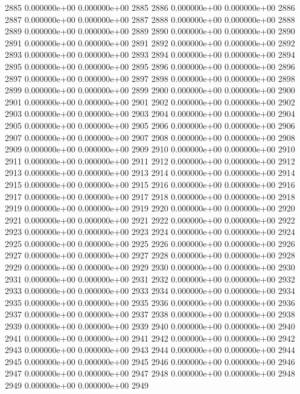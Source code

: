 \documentclass{article}
\begin{document}
\begin{Schunk}
\begin{Soutput}
2885   0.000000e+00   0.000000e+00 2885
2886   0.000000e+00   0.000000e+00 2886
2887   0.000000e+00   0.000000e+00 2887
2888   0.000000e+00   0.000000e+00 2888
2889   0.000000e+00   0.000000e+00 2889
2890   0.000000e+00   0.000000e+00 2890
2891   0.000000e+00   0.000000e+00 2891
2892   0.000000e+00   0.000000e+00 2892
2893   0.000000e+00   0.000000e+00 2893
2894   0.000000e+00   0.000000e+00 2894
2895   0.000000e+00   0.000000e+00 2895
2896   0.000000e+00   0.000000e+00 2896
2897   0.000000e+00   0.000000e+00 2897
2898   0.000000e+00   0.000000e+00 2898
2899   0.000000e+00   0.000000e+00 2899
2900   0.000000e+00   0.000000e+00 2900
2901   0.000000e+00   0.000000e+00 2901
2902   0.000000e+00   0.000000e+00 2902
2903   0.000000e+00   0.000000e+00 2903
2904   0.000000e+00   0.000000e+00 2904
2905   0.000000e+00   0.000000e+00 2905
2906   0.000000e+00   0.000000e+00 2906
2907   0.000000e+00   0.000000e+00 2907
2908   0.000000e+00   0.000000e+00 2908
2909   0.000000e+00   0.000000e+00 2909
2910   0.000000e+00   0.000000e+00 2910
2911   0.000000e+00   0.000000e+00 2911
2912   0.000000e+00   0.000000e+00 2912
2913   0.000000e+00   0.000000e+00 2913
2914   0.000000e+00   0.000000e+00 2914
2915   0.000000e+00   0.000000e+00 2915
2916   0.000000e+00   0.000000e+00 2916
2917   0.000000e+00   0.000000e+00 2917
2918   0.000000e+00   0.000000e+00 2918
2919   0.000000e+00   0.000000e+00 2919
2920   0.000000e+00   0.000000e+00 2920
2921   0.000000e+00   0.000000e+00 2921
2922   0.000000e+00   0.000000e+00 2922
2923   0.000000e+00   0.000000e+00 2923
2924   0.000000e+00   0.000000e+00 2924
2925   0.000000e+00   0.000000e+00 2925
2926   0.000000e+00   0.000000e+00 2926
2927   0.000000e+00   0.000000e+00 2927
2928   0.000000e+00   0.000000e+00 2928
2929   0.000000e+00   0.000000e+00 2929
2930   0.000000e+00   0.000000e+00 2930
2931   0.000000e+00   0.000000e+00 2931
2932   0.000000e+00   0.000000e+00 2932
2933   0.000000e+00   0.000000e+00 2933
2934   0.000000e+00   0.000000e+00 2934
2935   0.000000e+00   0.000000e+00 2935
2936   0.000000e+00   0.000000e+00 2936
2937   0.000000e+00   0.000000e+00 2937
2938   0.000000e+00   0.000000e+00 2938
2939   0.000000e+00   0.000000e+00 2939
2940   0.000000e+00   0.000000e+00 2940
2941   0.000000e+00   0.000000e+00 2941
2942   0.000000e+00   0.000000e+00 2942
2943   0.000000e+00   0.000000e+00 2943
2944   0.000000e+00   0.000000e+00 2944
2945   0.000000e+00   0.000000e+00 2945
2946   0.000000e+00   0.000000e+00 2946
2947   0.000000e+00   0.000000e+00 2947
2948   0.000000e+00   0.000000e+00 2948
2949   0.000000e+00   0.000000e+00 2949

\end{Soutput}
\end{Schunk}
\end{document}
